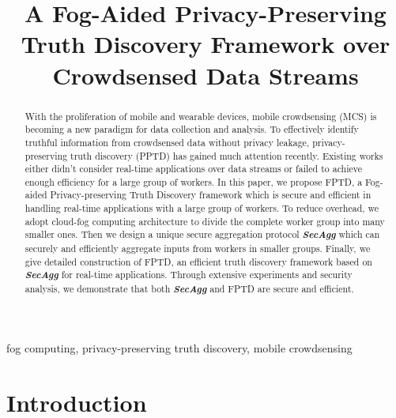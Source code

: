 \documentclass[conference,a4paper]{IEEEtran}
\def\textbi#1{\textbf{\em #1}}
\begin{document}
\title{A Fog-Aided Privacy-Preserving Truth Discovery Framework over Crowdsensed Data Streams}

\author{
}
\maketitle


\begin{abstract}
With the proliferation of mobile and wearable devices, mobile crowdsensing (MCS) is becoming a new paradigm for data collection and analysis. To effectively identify truthful information from crowdsensed data without privacy leakage, privacy-preserving truth discovery (PPTD) has gained much attention recently. Existing works either didn't consider real-time applications over data streams or failed to achieve enough efficiency for a large group of workers. In this paper, we propose FPTD, a Fog-aided Privacy-preserving Truth Discovery framework which is secure and efficient in handling real-time applications with a large group of workers. To reduce overhead, we adopt cloud-fog computing architecture to divide the complete worker group into many smaller ones. Then we design a unique secure aggregation protocol \textbi{SecAgg} which can securely and efficiently aggregate inputs from workers in smaller groups. Finally, we give detailed construction of FPTD, an efficient truth discovery framework based on \textbi{SecAgg} for real-time applications. Through extensive experiments and security analysis, we demonstrate that both \textbi{SecAgg} and FPTD are secure and efficient.
\end{abstract}

\begin{IEEEkeywords}
fog computing, privacy-preserving truth discovery, mobile crowdsensing
\end{IEEEkeywords}

\section{Introduction}\label{intro}
\end{document}
